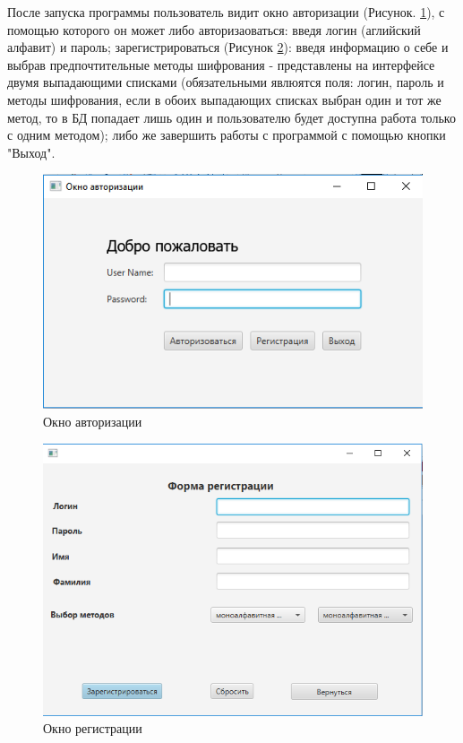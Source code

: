 \documentclass[a4paper,12pt]{article}
\begin{document}
\par После запуска программы пользователь видит окно авторизации (Рисунок. \ref{fig:login_form}), с помощью которого он может либо авторизаоваться: введя логин (аглийский алфавит) и пароль; зарегистрироваться (Рисунок \ref{fig:registry_form}): введя информацию о себе и выбрав предпочтительные методы шифрования - представлены на интерфейсе двумя выпадающими списками (обязательными явлюятся поля: логин, пароль и методы шифрования, если в обоих выпадающих списках выбран один и тот же метод, то в БД попадает лишь один и пользователю будет доступна работа только с одним методом); либо же завершить работы с программой с помощью кнопки "Выход".
\begin{center}
	\begin{figure}[h!]
		\centering
   		\includegraphics[scale=0.5]{img/login_form.png}
   		\caption{Окно авторизации}
   		\label{fig:login_form}
    \end{figure}
\end{center}
\begin{center}
	\begin{figure}[h!]
		\centering
   		\includegraphics[scale=0.5]{img/registry_form.png}
   		\caption{Окно регистрации}
   		\label{fig:registry_form}
    \end{figure}
\end{center}
\end{document}
